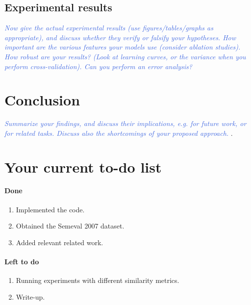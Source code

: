 \documentclass[11pt,letterpaper]{article}
\newcommand{\blue}[1]{\textcolor{RoyalBlue}{#1}}
\newcommand{\instructions}[1]{\blue{\textit{#1}}}
\begin{document}
\subsection{Experimental results}
\label{sec:experimental-results}
\instructions{Now give the actual experimental results (use figures/tables/graphs as appropriate), and discuss whether they verify or falsify your hypotheses. How important are the various features your models use (consider ablation studies). How robust are your results? (Look at learning curves, or the variance when you perform cross-validation). Can you perform an error analysis?}

\section{Conclusion}
\instructions{Summarize your findings, and discuss their implications, e.g. for future work, or for related tasks. Discuss also the shortcomings of your proposed approach. }. 

\section*{Your current to-do list}
\paragraph{Done}
\begin{enumerate}
\item Implemented the code.
\item Obtained the Semeval 2007 dataset.
\item Added relevant related work.
\end{enumerate}
\paragraph{Left to do}
\begin{enumerate}
\item Running experiments with different similarity metrics.
\item Write-up.
\end{enumerate}


  
\end{document}
